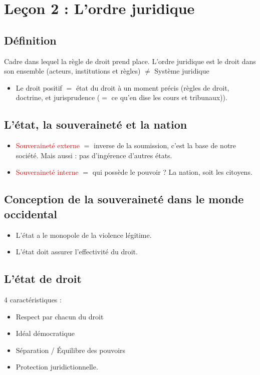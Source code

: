 \newpage
\chapter{Leçon 2 : L'ordre juridique}

\section{Définition}

Cadre dans lequel la règle de droit prend place. L'ordre juridique est le droit dans son ensemble (acteurs, institutions et règles) $\neq$ Système juridique

\begin{itemize}
    \item Le droit positif $=$ état du droit à un moment précis (règles de droit, doctrine, et jurisprudence ($=$ ce qu'en dise les cours et tribunaux)).
\end{itemize}

\section{L'état, la souveraineté et la nation}

\begin{itemize}
    \item \textcolor{red}{Souveraineté externe} $=$ inverse de la soumission, c'est la base de notre société. Mais aussi : pas d'ingérence d'autres états.
    \item \textcolor{red}{Souveraineté interne} $=$ qui possède le pouvoir ? La nation, soit les citoyens.
\end{itemize}

\section{Conception de la souveraineté dans le monde occidental}

\begin{itemize}
    \item L'état a le monopole de la violence légitime.
    \item L'état doit assurer l'effectivité du droit.
\end{itemize}

\section{L'état de droit}

4 caractéristiques :
\begin{itemize}
    \item Respect par chacun du droit
    \item Idéal démocratique
    \item Séparation / Équilibre des pouvoirs
    \item Protection juridictionnelle.
\end{itemize}

